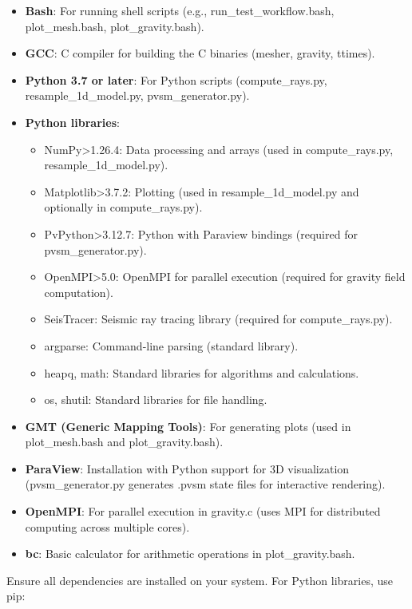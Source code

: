 \documentclass[12pt,a4paper]{article}
\begin{document}
\begin{itemize}
    \item \textbf{Bash}: For running shell scripts (e.g., run\_test\_workflow.bash, plot\_mesh.bash, plot\_gravity.bash).
    \item \textbf{GCC}: C compiler for building the C binaries (mesher, gravity, ttimes).
    \item \textbf{Python 3.7 or later}: For Python scripts (compute\_rays.py, resample\_1d\_model.py, pvsm\_generator.py).
    \item \textbf{Python libraries}:
        \begin{itemize}
            \item NumPy>1.26.4: Data processing and arrays (used in compute\_rays.py, resample\_1d\_model.py).
            \item Matplotlib>3.7.2: Plotting (used in resample\_1d\_model.py and optionally in compute\_rays.py).
            \item PvPython>3.12.7: Python with Paraview bindings (required for pvsm\_generator.py).
            \item OpenMPI>5.0: OpenMPI for parallel execution (required for gravity field computation).
            \item SeisTracer: Seismic ray tracing library (required for compute\_rays.py).
            \item argparse: Command-line parsing (standard library).
            \item heapq, math: Standard libraries for algorithms and calculations.
            \item os, shutil: Standard libraries for file handling.
        \end{itemize}
    \item \textbf{GMT (Generic Mapping Tools)}: For generating plots (used in plot\_mesh.bash and plot\_gravity.bash).
    \item \textbf{ParaView}: Installation with Python support for 3D visualization (pvsm\_generator.py generates .pvsm state files for interactive rendering).
    \item \textbf{OpenMPI}: For parallel execution in gravity.c (uses MPI for distributed computing across multiple cores).
    \item \textbf{bc}: Basic calculator for arithmetic operations in plot\_gravity.bash.
\end{itemize}

Ensure all dependencies are installed on your system. For Python libraries, use pip:
\end{document}
